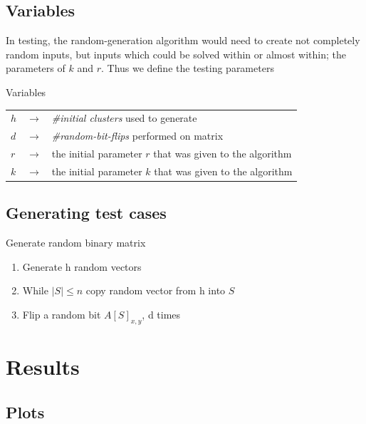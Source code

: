 \documentclass{beamer}
\begin{document}
\subsection{Variables}
\begin{frame}
  In testing, the random-generation algorithm would need to create not completely random inputs, but
  inputs which could be solved within or almost within; the parameters of $k$ and $r$. Thus we define
  the testing parameters

  \begin{block}{Variables}
    \begin{tabular}{lll}
      $h$ & $\rightarrow$ & \textit{\#initial clusters} used to generate              \\
      $d$ & $\rightarrow$ & \textit{\#random-bit-flips} performed on matrix           \\
      $r$ & $\rightarrow$ & the initial parameter $r$ that was given to the algorithm \\
      $k$ & $\rightarrow$ & the initial parameter $k$ that was given to the algorithm \\
    \end{tabular}
  \end{block}
\end{frame}

\subsection{Generating test cases}
\begin{frame}
  \begin{block}{Generate random binary matrix}
    \begin{enumerate}
      \item<1-> Generate \alert{h} random vectors
      \item<2-> While $|S| \leq n$ copy random vector from \alert{h} into $S$
      \item<3-> Flip a random bit $A[S]_{x,y}$, \alert{d} times
    \end{enumerate}
  \end{block}
\end{frame}

\section{Results}
\subsection{Plots}
\end{document}
